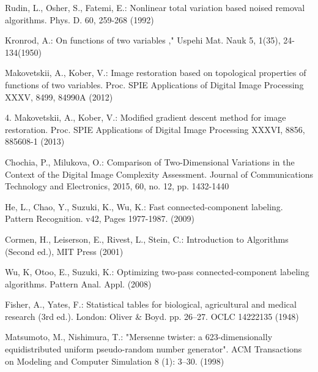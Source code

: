\documentclass[hidelinks]{llncs}
\begin{document}
\begin{thebibliography}{5}

Rudin, L., Osher, S., Fatemi, E.: Nonlinear total variation based noised removal algorithms. Phys. D. 60, 259-268 (1992)

Kronrod, A.: On functions of two variables ," Uspehi Mat. Nauk 5, 1(35), 24-134(1950)

Makovetskii, A., Kober, V.: Image restoration based on topological properties of functions of two variables.  Proc. SPIE Applications of Digital Image Processing XXXV, 8499, 84990A (2012)

4.	Makovetskii, A., Kober, V.: Modified gradient descent method for image restoration. Proc. SPIE Applications of Digital Image Processing XXXVI, 8856, 885608-1 (2013)

Chochia, P., Milukova, O.: Comparison of Two-Dimensional Variations in the Context of the Digital Image Complexity Assessment.  Journal of Communications Technology and Electronics, 2015, 60, no. 12,  pp. 1432-1440

He, L., Chao, Y., Suzuki, K., Wu, K.:
Fast connected-component labeling. Pattern Recognition. v42, Pages 1977-1987. (2009)


Cormen, H., Leiserson, E., Rivest, L., Stein, C.:
Introduction to Algorithms (Second ed.), MIT Press (2001)

Wu, K, Otoo, E., Suzuki, K.:
Optimizing two-pass connected-component labeling algorithms.
Pattern Anal. Appl. (2008)

 Fisher, A., Yates, F.:
 Statistical tables for biological, agricultural and medical research (3rd ed.). 
 London: Oliver \& Boyd. pp. 26–27. OCLC 14222135 (1948)
 
Matsumoto, M., Nishimura, T.:
"Mersenne twister: a 623-dimensionally equidistributed uniform pseudo-random number generator".
ACM Transactions on Modeling and Computer Simulation 8 (1): 3–30. (1998)

\end{thebibliography}
\end{document}
